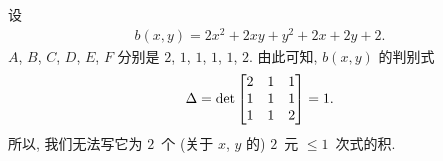 \documentclass[../libro.tex]{subfiles}
\begin{document}
\begin{example}
    设
    \begin{align*}
        b(x, y) = 2x^2 + 2xy + y^2 + 2x + 2y + 2.
    \end{align*}
    \(A\), \(B\), \(C\), \(D\), \(E\), \(F\)
    分别是
    \(2\), \(1\), \(1\), \(1\), \(1\), \(2\).
    由此可知, \(b(x, y)\) 的判别式
    \begin{align*}
        \Delta
        =  \det
        \begin{bmatrix}
            2 & 1 & 1 \\
            1 & 1 & 1 \\
            1 & 1 & 2 \\
        \end{bmatrix} 
        = 1.
    \end{align*}
    所以, 我们无法写它为 \(2\)~个
    (关于 \(x\), \(y\) 的)
    \(2\)~元 \({\leq} 1\)~次式的积.
\end{example}
\end{document}
